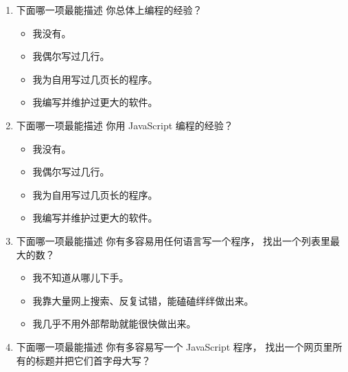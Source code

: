 \begin{enumerate}

\item
  下面哪一项最能描述
  你总体上编程的经验？

  \begin{itemize}
    
  \item
    我没有。
    
  \item
    我偶尔写过几行。
    
  \item
    我为自用写过几页长的程序。
    
  \item
    我编写并维护过更大的软件。\\
    
  \end{itemize}

\item
  下面哪一项最能描述
  你用 JavaScript 编程的经验？

  \begin{itemize}
    
  \item
    我没有。
    
  \item
    我偶尔写过几行。
    
  \item
    我为自用写过几页长的程序。
    
  \item
    我编写并维护过更大的软件。\\
    
  \end{itemize}

\item
  下面哪一项最能描述
  你有多容易用任何语言写一个程序，
  找出一个列表里最大的数？

  \begin{itemize}
    
  \item
    我不知道从哪儿下手。
    
  \item
    我靠大量网上搜索、反复试错，能磕磕绊绊做出来。
    
  \item
    我几乎不用外部帮助就能很快做出来。\\
    
  \end{itemize}

\item
  下面哪一项最能描述
  你有多容易写一个 JavaScript 程序，
  找出一个网页里所有的标题并把它们首字母大写？


\end{enumerate}
